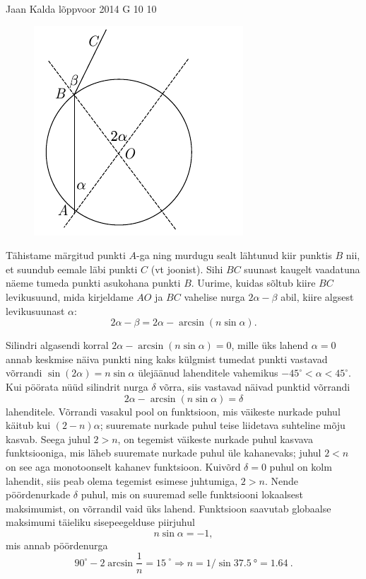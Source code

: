 \documentclass[11pt]{article}
\begin{document}
{%
{Jaan Kalda} %
{lõppvoor} %
{2014} %
{G 10} %
{10} %
{

\ifSolution
\begin{figure}%
\includegraphics[trim = 0mm 0mm 12mm 0mm, clip, width=1\linewidth]{2014-v3g-10-silinder}
\end{figure}

Tähistame märgitud punkti $A$-ga ning murdugu sealt lähtunud kiir punktis $B$ nii, et suundub eemale läbi punkti $C$ (vt joonist).
Sihi $BC$ suunast kaugelt vaadatuna näeme tumeda punkti asukohana punkti $B$. Uurime, kuidas sõltub kiire $BC$ levikusuund, mida kirjeldame 
$AO$ ja $BC$ vahelise nurga $2\alpha-\beta$ abil, kiire algsest levikusuunast $\alpha$:
$$2\alpha-\beta= 2\alpha-\arcsin (n\sin\alpha).$$

Silindri algasendi korral $2\alpha-\arcsin (n\sin\alpha) =0$, mille üks lahend $\alpha=0$ annab keskmise näiva punkti
ning kaks külgmist tumedat punkti vastavad võrrandi $\sin(2\alpha)=n\sin\alpha$ ülejäänud lahenditele vahemikus $-45^\circ <\alpha<45^\circ$.
Kui pöörata nüüd silindrit nurga $\delta$ võrra, siis vastavad näivad punktid võrrandi 
$$2\alpha-\arcsin (n\sin\alpha) =\delta$$
lahenditele. Võrrandi vasakul pool on funktsioon, mis väikeste nurkade puhul käitub kui $(2-n)\alpha$; suuremate nurkade puhul teise liidetava suhteline mõju kasvab.
Seega juhul $2>n$, on tegemist väikeste nurkade puhul kasvava funktsiooniga, mis läheb suuremate nurkade puhul üle kahanevaks;
juhul $2<n$ on see aga monotoonselt kahanev funktsioon. Kuivõrd $\delta=0$ puhul on kolm lahendit, siis peab olema tegemist esimese juhtumiga, $2>n$.
Nende pöördenurkade $\delta$ puhul, mis on suuremad selle funktsiooni lokaalsest maksimumist, on võrrandil vaid üks lahend.
Funktsioon saavutab globaalse maksimumi täieliku sisepeegelduse piirjuhul 
$$n\sin\alpha=-1,$$
mis annab pöördenurga
$$90^\circ-2\arcsin \frac 1n=\SI{15}{}^\circ\Rightarrow n=1/\sin \SI{37,5}{\degree} = \SI{1,64}{}.$$
\fi
}

}
\end{document}
